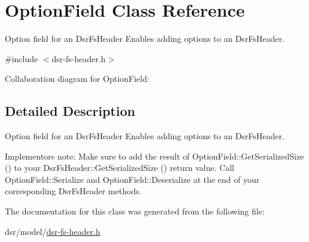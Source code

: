 \hypertarget{classOptionField}{}\section{Option\+Field Class Reference}
\label{classOptionField}


Option field for an Dsr\+Fs\+Header Enables adding options to an Dsr\+Fs\+Header.  




{\ttfamily \#include $<$dsr-\/fs-\/header.\+h$>$}



Collaboration diagram for Option\+Field\+:


\subsection{Detailed Description}
Option field for an Dsr\+Fs\+Header Enables adding options to an Dsr\+Fs\+Header. 

Implementor\textquotesingle{}s note\+: Make sure to add the result of Option\+Field\+::\+Get\+Serialized\+Size () to your Dsr\+Fs\+Header\+::\+Get\+Serialized\+Size () return value. Call Option\+Field\+::\+Serialize and Option\+Field\+::\+Deserialize at the end of your corresponding Dsr\+Fs\+Header methods. 

The documentation for this class was generated from the following file\+:\begin{DoxyCompactItemize}
\item 
dsr/model/\hyperlink{dsr-fs-header_8h}{dsr-\/fs-\/header.\+h}\end{DoxyCompactItemize}
